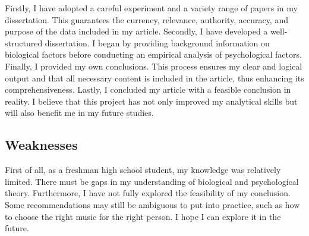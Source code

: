 \documentclass[man,floatsintext]{apa7}
\begin{document}
Firstly, I have adopted a careful experiment and a variety range of papers in my dissertation. This guarantees the currency, relevance, authority, accuracy, and purpose of the data included in my article.
Secondly, I have developed a well-structured dissertation. I began by providing background information on biological factors before conducting an empirical analysis of psychological factors. Finally, I provided my own conclusions. This process ensures my clear and logical output and that all necessary content is included in the article, thus enhancing its comprehensiveness.
Lastly, I concluded my article with a feasible conclusion in reality. I believe that this project has not only improved my analytical skills but will also benefit me in my future studies. 

\subsection{Weaknesses}

First of all, as a freshman high school student, my knowledge was relatively limited. There must be gaps in my understanding of biological and psychological theory. Furthermore, I have not fully explored the feasibility of my conclusion. Some recommendations may still be ambiguous to put into practice, such as how to choose the right music for the right person. I hope I can explore it in the future.

\newpage
\printbibliography{}
\end{document}
